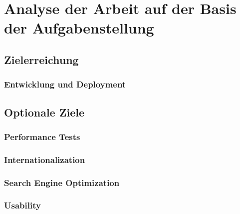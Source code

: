
\chapter{Analyse der Arbeit auf der Basis der Aufgabenstellung}
\section{Zielerreichung}
\subsection{Entwicklung und Deployment}

\section{Optionale Ziele}

\subsection{Performance Tests}

\subsection{Internationalization}

\subsection{Search Engine Optimization}

\subsection{Usability}

